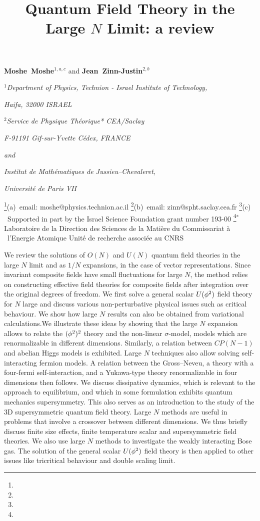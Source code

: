


\title{Quantum Field Theory in the Large $N$ Limit: a review}

\centerline{{\bf Moshe~Moshe}${}^{1 ,a,c}$ and {\bf
Jean~Zinn-Justin}${}^{2,b}$}
\bigskip
{\baselineskip14pt
\centerline{${}^1$\it Department of Physics, Technion - Israel
Institute of Technology,} \centerline{\it Haifa, 32000 ISRAEL}
\smallskip
\centerline{${}^2$\it  Service de Physique Th\'eorique* CEA/Saclay}
\centerline{\it F-91191 Gif-sur-Yvette C\'edex, FRANCE}
\centerline{\it and} \centerline{\it Institut de Math\'ematiques
de Jussieu--Chevaleret,} \centerline{\it Universit\'e de Paris
VII} }
\footnote{}{(a)~email: moshe@physics.technion.ac.il}
\footnote{}{(b)~email: zinn@spht.saclay.cea.fr} \footnote{}{(c)
~Supported in part by the Israel Science Foundation grant number
193-00}
 \footnote{}{${^*}$Laboratoire de la Direction des Sciences
de la Mati\`ere du Commissariat \`a \indent \ l'Energie Atomique
Unit\'e de recherche associ\'ee au CNRS} \vskip 3mm




\abstract We review the solutions of $O(N)$ and $U(N)$ quantum field theories  in
the large $N$ limit and as $1/N$ expansions, in the case of vector
representations. Since invariant composite fields have small
fluctuations for large $N$, the method relies on constructing
effective field theories for composite fields after integration
over the original degrees of freedom. We first solve  a general
scalar $U({\phi}^2)$ field theory for $N$ large and discuss various
non-perturbative physical issues such as critical behaviour.  We
show how large $N$ results can also be obtained from variational
calculations.We illustrate these ideas by showing that the large
$N$ expansion allows to relate the $({\phi}^2)^2$ theory and the
non-linear $\sigma$-model, models which are renormalizable in
different dimensions. Similarly, a  relation
between $CP(N-1)$ and abelian Higgs models is exhibited.
Large $N$
techniques also allow solving self-interacting fermion models.
A relation between  the Gross--Neveu,   a theory with a four-fermi
self-interaction, and a Yukawa-type theory renormalizable in four
dimensions then follows. We discuss dissipative dynamics,
which is relevant to the approach to equilibrium, and which in
some formulation exhibits quantum mechanics supersymmetry. This
also serves as an introduction to the study of the 3D
supersymmetric quantum  field theory. Large
$N$ methods are useful in problems that involve a crossover between different dimensions. We thus  briefly discuss  finite
size effects, finite temperature scalar and supersymmetric field
theories. We also use large $N$ methods to investigate the weakly interacting Bose gas. The solution of the general scalar $U({\phi}^2)$ field theory is then applied to other  issues like tricritical behaviour and double
scaling limit.
\endabstract
\vfill\eject
\listcontent
\vfill\eject
